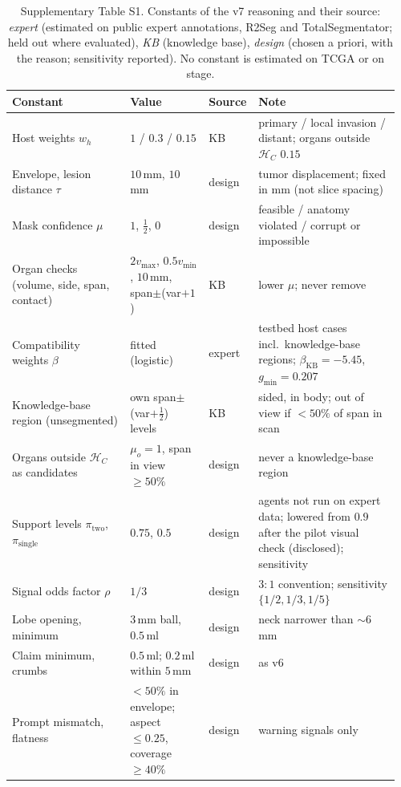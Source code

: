 \documentclass[fleqn,10pt]{olplainarticle}
\begin{document}
\begin{table}[t]
\centering\footnotesize
\caption{Supplementary Table S1. Constants of the v7 reasoning and their source: \emph{expert} (estimated on public expert
annotations, R2Seg and TotalSegmentator; held out where evaluated), \emph{KB} (knowledge base), \emph{design} (chosen a priori,
with the reason; sensitivity reported). No constant is estimated on TCGA or on stage.}
\label{tab:constants}
\setlength{\tabcolsep}{3pt}
\begin{tabular}{p{0.30\linewidth}p{0.20\linewidth}p{0.10\linewidth}p{0.36\linewidth}}
\hline
Constant & Value & Source & Note\\
\hline
Host weights $w_h$ & $1$ / $0.3$ / $0.15$ & KB & primary / local invasion / distant; organs outside $\mathcal{H}_C$ $0.15$\\
Envelope, lesion distance $\tau$ & $10$\,mm, $10$\,mm & design & tumor displacement; fixed in mm (not slice spacing)\\
Mask confidence $\mu$ & $1$, $\tfrac12$, $0$ & design & feasible / anatomy violated / corrupt or impossible\\
Organ checks (volume, side, span, contact) & $2v_{\max}$, $0.5v_{\min}$, $10$\,mm, span$\pm$(var$+1$) & KB & lower $\mu$; never remove\\
Compatibility weights $\beta$ & fitted (logistic) & expert & testbed host cases incl.\ knowledge-base regions; $\beta_{\mathrm{KB}}=-5.45$, $g_{\min}=0.207$\\
Knowledge-base region (unsegmented) & own span$\pm$(var$+\tfrac12$) levels & KB & sided, in body; out of view if $<50\%$ of span in scan\\
Organs outside $\mathcal{H}_C$ as candidates & $\mu_o=1$, span in view $\ge50\%$ & design & never a knowledge-base region\\
Support levels $\pi_{\text{two}}$, $\pi_{\text{single}}$ & $0.75$, $0.5$ & design & agents not run on expert data; lowered from $0.9$ after the pilot visual check (disclosed); sensitivity\\
Signal odds factor $\rho$ & $1/3$ & design & $3{:}1$ convention; sensitivity $\{1/2,1/3,1/5\}$\\
Lobe opening, minimum & $3$\,mm ball, $0.5$\,ml & design & neck narrower than $\sim6$\,mm\\
Claim minimum, crumbs & $0.5$\,ml; $0.2$\,ml within $5$\,mm & design & as v6\\
Prompt mismatch, flatness & $<50\%$ in envelope; aspect $\le0.25$, coverage $\ge40\%$ & design & warning signals only\\

\end{tabular}
\end{table}
\end{document}
